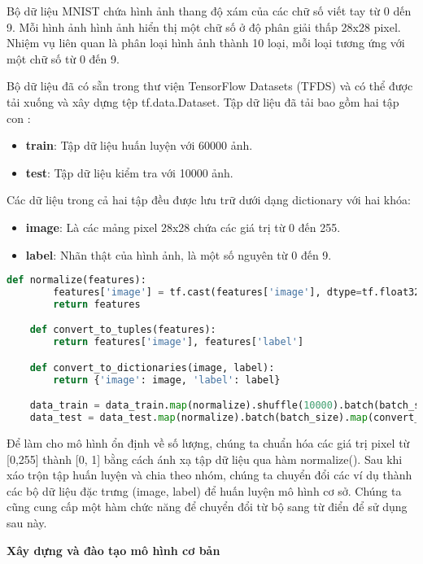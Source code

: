 Bộ dữ liệu MNIST chứa hình ảnh thang độ xám của các chữ số viết tay từ 0 dến 9. Mỗi hình ảnh hình ảnh hiển thị một chữ số ở độ phân giải thấp 28x28 pixel.
Nhiệm vụ liên quan là phân loại hình ảnh thành 10 loại, mỗi loại tương ứng với một chữ số từ 0 đến 9.

Bộ dữ liệu đã có sẵn trong thư viện TensorFlow Datasets (TFDS) và có thể được tải xuống và xây dựng tệp tf.data.Dataset.
Tập dữ liệu đã tải bao gồm hai tập con :
\begin{itemize}
    \item \textbf{train}: Tập dữ liệu huấn luyện với 60000 ảnh.
    \item \textbf{test}: Tập dữ liệu kiểm tra với 10000 ảnh.
\end{itemize}

Các dữ liệu trong cả hai tập đều được lưu trữ dưới dạng dictionary với hai khóa:
\begin{itemize}
    \item \textbf{image}: Là các mảng pixel 28x28 chứa các giá trị từ 0 đến 255.
    \item \textbf{label}: Nhãn thật của hình ảnh, là một số nguyên từ 0 đến 9.
\end{itemize}

\begin{lstlisting}[language=Python]
    def normalize(features):
        features['image'] = tf.cast(features['image'], dtype=tf.float32) / 255.0
        return features

    def convert_to_tuples(features):
        return features['image'], features['label']

    def convert_to_dictionaries(image, label):
        return {'image': image, 'label': label}

    data_train = data_train.map(normalize).shuffle(10000).batch(batch_size).map(convert_to_tuples)
    data_test = data_test.map(normalize).batch(batch_size).map(convert_to_tuples)

\end{lstlisting}

Để làm cho mô hình ổn định về số lượng, chúng ta chuẩn hóa các giá trị pixel từ [0,255] thành [0, 1] bằng cách ánh xạ tập dữ liệu qua hàm normalize(). Sau khi xáo 
trộn tập huấn luyện và chia theo nhóm, chúng ta chuyển đổi các ví dụ thành các bộ dữ liệu đặc trưng (image, label) để huấn luyện mô hình cơ sở. Chúng ta 
cũng cung cấp một hàm chức năng để chuyển đổi từ bộ sang từ điển để sử dụng sau này.

\textbf{Xây dựng và đào tạo mô hình cơ bản}

